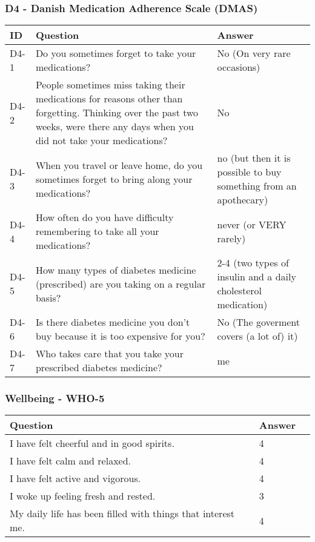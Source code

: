 \subsubsection{D4 - Danish Medication Adherence Scale (DMAS)}
\begin{table}[H]
    \centering
    \renewcommand{\arraystretch}{1.2}
    \begin{tabularx}{\textwidth}{|l|X|l|}
        \hline
        \textbf{ID} & \textbf{Question} & \textbf{Answer} \\ \hline
        D4-1 & Do you sometimes forget to take your medications? & 
        No (On very rare occasions)  
        \\ \hline
        D4-2 & People sometimes miss taking their medications for reasons other than forgetting. Thinking over the past two weeks, were there any days when you did not take your medications? & 
        No  
        \\ \hline
        D4-3 & When you travel or leave home, do you sometimes forget to bring along your medications? & 
        no (but then it is possible to buy something from an apothecary)  
        \\ \hline
        D4-4 & How often do you have difficulty remembering to take all your medications? & 
        never (or VERY rarely) 
        \\ \hline
        D4-5 & How many types of diabetes medicine (prescribed) are you taking on a regular basis? & 
        2-4 (two types of insulin and a daily cholesterol medication) 
        \\ \hline
        D4-6 & Is there diabetes medicine you don't buy because it is too expensive for you? & 
        No (The goverment covers (a lot of) it) 
        \\ \hline
        D4-7 & Who takes care that you take your prescribed diabetes medicine? &  
        me 
        \\ \hline
    \end{tabularx}
\end{table}

\subsubsection{Wellbeing - WHO-5}
\begin{table}[H]
    \centering
    \renewcommand{\arraystretch}{1.2}
    \begin{tabularx}{\textwidth}{|l|X|l|}
        \hline
        \textbf{Question} & \textbf{Answer} \\ \hline
        I have felt cheerful and in good spirits. & 
        4 
        \\ \hline
        I have felt calm and relaxed. & 
        4 
        \\ \hline
        I have felt active and vigorous. & 
        4 
        \\ \hline
        I woke up feeling fresh and rested. & 
        3 
        \\ \hline
        My daily life has been filled with things that interest me. & 
        4
        \\ \hline
    \end{tabularx}
\end{table}

